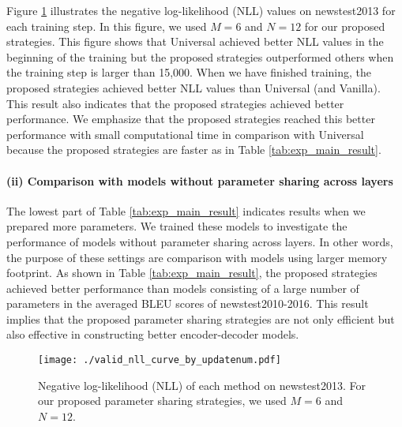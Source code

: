 \documentclass[11pt]{article}
\begin{document}
Figure \ref{fig:valid_nll_by_time} illustrates the negative log-likelihood (NLL) values on newstest2013 for each training step.
In this figure, we used $M=6$ and $N=12$ for our proposed strategies.
This figure shows that Universal achieved better NLL values in the beginning of the training but the proposed strategies outperformed others when the training step is larger than 15,000.
When we have finished training, the proposed strategies achieved better NLL values than Universal (and Vanilla).
This result also indicates that the proposed strategies achieved better performance.
We emphasize that the proposed strategies reached this better performance with small computational time in comparison with Universal because the proposed strategies are faster as in Table \ref{tab:exp_main_result}.




\paragraph{(ii) Comparison with models without parameter sharing across layers}
The lowest part of Table \ref{tab:exp_main_result} indicates results when we prepared more parameters.
We trained these models to investigate the performance of models without parameter sharing across layers.
In other words, the purpose of these settings are comparison with models using larger memory footprint.
As shown in Table \ref{tab:exp_main_result}, the proposed strategies achieved better performance than models consisting of a large number of parameters in the averaged BLEU scores of newstest2010-2016.
This result implies that the proposed parameter sharing strategies are not only efficient but also effective in constructing better encoder-decoder models.


\begin{figure}[!t]
  \centering 
  \texttt{[image: ./valid\_nll\_curve\_by\_updatenum.pdf]}
   \caption{Negative log-likelihood (NLL) of each method on newstest2013. For our proposed parameter sharing strategies, we used $M=6$ and $N=12$.}
   \label{fig:valid_nll_by_time}
\end{figure}
\end{document}
